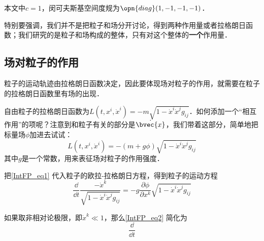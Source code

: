 

本文中$c=1$，闵可夫斯基空间度规为$\opn{diag}(1, -1, -1, -1)$．

特别要强调，我们并不是把粒子和场分开讨论，得到两种作用量或者拉格朗日函数；我们研究的是粒子和场构成的整体，只有对这个整体的\textbf{一个}作用量．

\subsection{场对粒子的作用}

粒子的运动轨迹由拉格朗日函数决定，因此要体现场对粒子的作用，就需要在粒子的拉格朗日函数里有场的出现．

自由粒子的拉格朗日函数为$L(t, x^i, \dot{x}^i) = -m\sqrt{1-\dot{x}^i\dot{x}^jg_{ij}}$．如何添加一个“相互作用”的项呢？注意到和粒子有关的部分是$\dot{\bvec{x}}$，我们带着这部分，简单地把标量场$\phi$加进去试试：
\begin{equation}\label{IntFP_eq1}
L(t, x^i, \dot{x}^i) = -(m+g\phi)\sqrt{1-\dot{x}^i\dot{x}^jg_{ij}}
\end{equation}
其中$g$是一个常数，用来表征场对粒子的作用强度．

把\autoref{IntFP_eq1} 代入粒子的欧拉-拉格朗日方程，得到粒子的运动方程
\begin{equation}\label{IntFP_eq2}
\frac{\dd }{\dd t} \frac{-\dot{x}^k}{\sqrt{1-\dot{x}^i\dot{x}^jg_{ij}}} = -g\frac{\partial \phi}{\partial x^k}\sqrt{1-\dot{x}^i\dot{x}^jg_{ij}}
\end{equation}

如果取非相对论极限，即$\dot{x}^k\ll 1$，那么\autoref{IntFP_eq2} 简化为
\begin{equation}
\frac{\dd}{\dd t}
\end{equation}
























